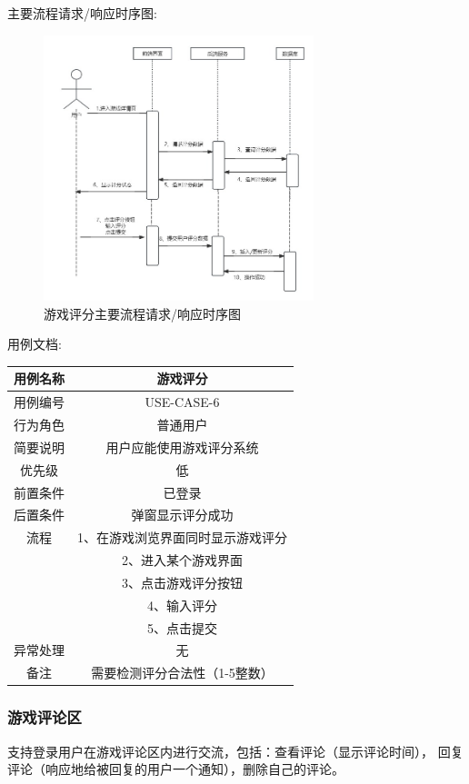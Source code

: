 \documentclass[12pt]{ctexart} %
\begin{document}
主要流程请求/响应时序图:
\begin{figure}[ht]
  \centering
  \includegraphics[width=0.7\textwidth]{yongli6.jpg}
  \caption{游戏评分主要流程请求/响应时序图}
\end{figure}
用例文档:

\begin{tabular}{|c|c|}
  \hline
  用例名称& 游戏评分\\
  \hline
  用例编号 & USE-CASE-6\\
  \hline
  行为角色 & 普通用户\\
  \hline
  简要说明 & 用户应能使用游戏评分系统\\
  \hline
  优先级 & 低\\
  \hline
  前置条件 & 已登录\\
  \hline
  后置条件 & 弹窗显示评分成功\\
  \hline
  流程 & 1、在游戏浏览界面同时显示游戏评分\\
      & 2、进入某个游戏界面\\
      &  3、点击游戏评分按钮\\
      &  4、输入评分\\
      &  5、点击提交\\
  \hline
  异常处理 & 无\\
  \hline
  备注 & 需要检测评分合法性（1-5整数）\\
  \hline
\end{tabular}

\subsubsection{游戏评论区}
支持登录用户在游戏评论区内进行交流，包括：查看评论（显示评论时间），
回复评论（响应地给被回复的用户一个通知），删除自己的评论。
\end{document}
